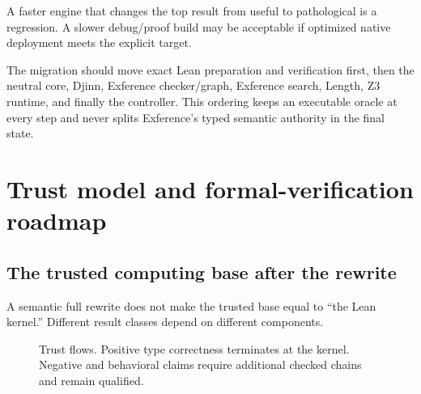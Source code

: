 \documentclass[10pt,letterpaper,oneside]{report}
\newcommand{\Lean}{Lean~4}
\begin{document}
A faster engine that changes the top result from useful to pathological is a regression. A slower debug/proof build may be acceptable if optimized native deployment meets the explicit target.

\begin{summarybox}
The migration should move exact Lean preparation and verification first, then the neutral core, Djinn, Exference checker/graph, Exference search, Length, Z3 runtime, and finally the controller. This ordering keeps an executable oracle at every step and never splits Exference's typed semantic authority in the final state.
\end{summarybox}

\chapter[Trust model and formal-verification roadmap]{Trust model and formal-verification\\roadmap}\label{ch:trust}

\section{The trusted computing base after the rewrite}

A semantic full rewrite does not make the trusted base equal to ``the Lean kernel.'' Different result classes depend on different components.

\begin{figure}[H]
\centering
{}
\caption{Trust flows. Positive type correctness terminates at the kernel. Negative and behavioral claims require additional checked chains and remain qualified.}
\end{figure}
\end{document}
